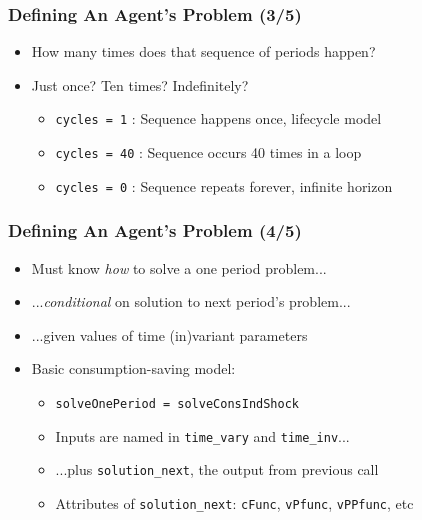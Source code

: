 \documentclass[11ptt]{beamer}
\newcommand{\bi}{\begin{itemize}}
\newcommand{\ei}{\end{itemize}}
\begin{document}
\begin{frame}
\frametitle{Defining An Agent's Problem (3/5)}
\bi
\item <1->How many times does that sequence of periods happen?

\item <1->Just once?  Ten times?  Indefinitely?
\bi
\item \texttt{cycles = 1} : Sequence happens once, lifecycle model

\item \texttt{cycles = 40} : Sequence occurs 40 times in a loop

\item \texttt{cycles = 0} : Sequence repeats forever, infinite horizon
\ei
\ei
\end{frame}



\begin{frame}
\frametitle{Defining An Agent's Problem (4/5)}
\bi
\item <1->Must know \textit{how} to solve a one period problem...

\item <1->...\textit{conditional} on solution to next period's problem...

\item <1->...given values of time (in)variant parameters

\item <2->Basic consumption-saving model:
\bi
\item \texttt{solveOnePeriod = solveConsIndShock}

\item Inputs are named in \texttt{time\_vary} and \texttt{time\_inv}...

\item ...plus \texttt{solution\_next}, the output from previous call

\item Attributes of \texttt{solution\_next}: \texttt{cFunc}, \texttt{vPfunc}, \texttt{vPPfunc}, etc 
\ei
\ei
\end{frame}
\end{document}
